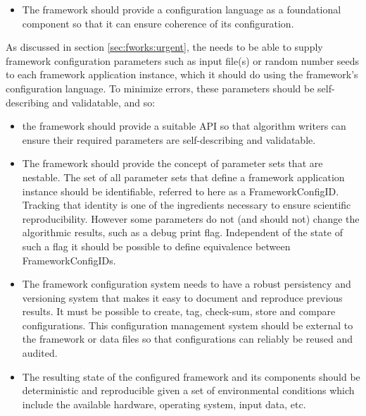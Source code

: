 \documentclass[../main-v1.tex]{subfiles}
\begin{document}
\begin{itemize}
\item The framework should provide a configuration language as a foundational component so that it can ensure coherence of its configuration.
\end{itemize}

As discussed in section \ref{sec:fworks:urgent}, the  needs to be able to supply framework configuration parameters such as input file(s) or random number seeds to each framework application instance, which it should do using the framework’s configuration language.  To minimize errors, these parameters should be self-describing and validatable, and so:

\begin{itemize}
\item the framework should provide a suitable API so that algorithm writers can ensure their required parameters are self-describing and validatable.

\item The framework should provide the concept of parameter sets that are nestable.  The set of all parameter sets that define a framework application instance should be identifiable, referred to here as a FrameworkConfigID.  Tracking that identity is one of the ingredients necessary to ensure scientific reproducibility.  However some parameters do not (and should not) change the algorithmic results, such as a debug print flag.  Independent of the state of such a flag it should be possible to define equivalence between FrameworkConfigIDs.

\item The framework configuration system needs to have a robust persistency and versioning system that makes it easy to document and reproduce previous results.  It must be possible to create, tag, check-sum, store and compare configurations.  This configuration management system should be external to the framework or data files so that configurations can reliably be reused and audited.  


\item The resulting state of the configured framework and its components should be deterministic and reproducible given a set of environmental conditions which include the available hardware, operating system, input data, etc.  
\end{itemize}
\end{document}
